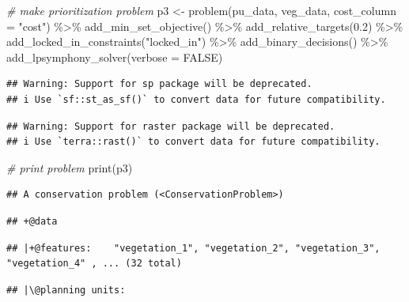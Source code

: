 \documentclass[
  12pt,
]{book}
\newenvironment{Shaded}{\begin{snugshade}}{\end{snugshade}}
\newcommand{\AttributeTok}[1]{\textcolor[rgb]{0.77,0.63,0.00}{#1}}
\newcommand{\CommentTok}[1]{\textcolor[rgb]{0.56,0.35,0.01}{\textit{#1}}}
\newcommand{\ConstantTok}[1]{\textcolor[rgb]{0.00,0.00,0.00}{#1}}
\newcommand{\FloatTok}[1]{\textcolor[rgb]{0.00,0.00,0.81}{#1}}
\newcommand{\FunctionTok}[1]{\textcolor[rgb]{0.00,0.00,0.00}{#1}}
\newcommand{\NormalTok}[1]{#1}
\newcommand{\OtherTok}[1]{\textcolor[rgb]{0.56,0.35,0.01}{#1}}
\newcommand{\SpecialCharTok}[1]{\textcolor[rgb]{0.00,0.00,0.00}{#1}}
\newcommand{\StringTok}[1]{\textcolor[rgb]{0.31,0.60,0.02}{#1}}
\begin{document}
\begin{Shaded}
\begin{Highlighting}[]
\CommentTok{\# make prioritization problem}
\NormalTok{p3 }\OtherTok{\textless{}{-}} \FunctionTok{problem}\NormalTok{(pu\_data, veg\_data, }\AttributeTok{cost\_column =} \StringTok{"cost"}\NormalTok{) }\SpecialCharTok{\%\textgreater{}\%}
      \FunctionTok{add\_min\_set\_objective}\NormalTok{() }\SpecialCharTok{\%\textgreater{}\%}
      \FunctionTok{add\_relative\_targets}\NormalTok{(}\FloatTok{0.2}\NormalTok{) }\SpecialCharTok{\%\textgreater{}\%}
      \FunctionTok{add\_locked\_in\_constraints}\NormalTok{(}\StringTok{"locked\_in"}\NormalTok{) }\SpecialCharTok{\%\textgreater{}\%}
      \FunctionTok{add\_binary\_decisions}\NormalTok{() }\SpecialCharTok{\%\textgreater{}\%}
      \FunctionTok{add\_lpsymphony\_solver}\NormalTok{(}\AttributeTok{verbose =} \ConstantTok{FALSE}\NormalTok{)}
\end{Highlighting}
\end{Shaded}

\begin{verbatim}
## Warning: Support for sp package will be deprecated.
## i Use `sf::st_as_sf()` to convert data for future compatibility.
\end{verbatim}

\begin{verbatim}
## Warning: Support for raster package will be deprecated.
## i Use `terra::rast()` to convert data for future compatibility.
\end{verbatim}

\begin{Shaded}
\begin{Highlighting}[]
\CommentTok{\# print problem}
\FunctionTok{print}\NormalTok{(p3)}
\end{Highlighting}
\end{Shaded}

\begin{verbatim}
## A conservation problem (<ConservationProblem>)
\end{verbatim}

\begin{verbatim}
## +@data
\end{verbatim}

\begin{verbatim}
## |+@features:    "vegetation_1", "vegetation_2", "vegetation_3", "vegetation_4" , ... (32 total)
\end{verbatim}

\begin{verbatim}
## |\@planning units:
\end{verbatim}
\end{document}
